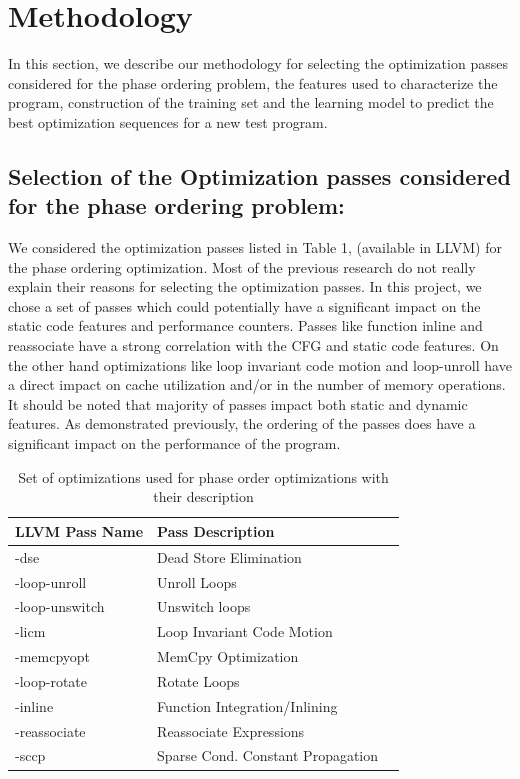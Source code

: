 \documentclass[10pt]{sigplanconf}
\begin{document}
\section{Methodology}
\noindent
In this section, we describe our methodology for selecting the optimization passes considered for the phase ordering problem, the features used to characterize the program, construction of the training set and the learning model to predict the best optimization sequences for a new test program.


\subsection{Selection of the Optimization passes considered for the phase ordering problem:}
We considered the optimization passes listed in Table 1, (available in LLVM) for the phase ordering optimization. Most of the previous research do not really explain their reasons for  selecting the optimization passes. In this project, we chose a set of passes which could potentially have a significant impact on the static code features and performance counters. Passes like function inline and reassociate have a strong correlation with the CFG and static code features. On the other hand optimizations like loop invariant code motion and  loop-unroll have a direct impact on cache utilization and/or in the number of memory operations. It should be noted that majority of passes impact both static and dynamic features. As demonstrated previously, the ordering of the passes does have a significant impact on the performance of the program.


\begin{table}[tbl1]
\caption{Set of optimizations used for phase order optimizations with their description}
\begin{tabular} {lll}
\hline
\bf{ LLVM Pass Name} & \bf{Pass Description} \\ \hline
-dse & Dead Store Elimination \\ \hline
-loop-unroll & Unroll Loops \\ \hline
-loop-unswitch & Unswitch loops \\ \hline
-licm & Loop Invariant Code Motion \\ \hline
-memcpyopt & MemCpy Optimization \\ \hline
-loop-rotate & Rotate Loops \\ \hline
-inline & Function Integration/Inlining \\ \hline
-reassociate & Reassociate Expressions \\ \hline
-sccp & Sparse Cond. Constant Propagation \\ \hline

\end{tabular}
\label{tb:tbl1}
\end{table}
\end{document}
